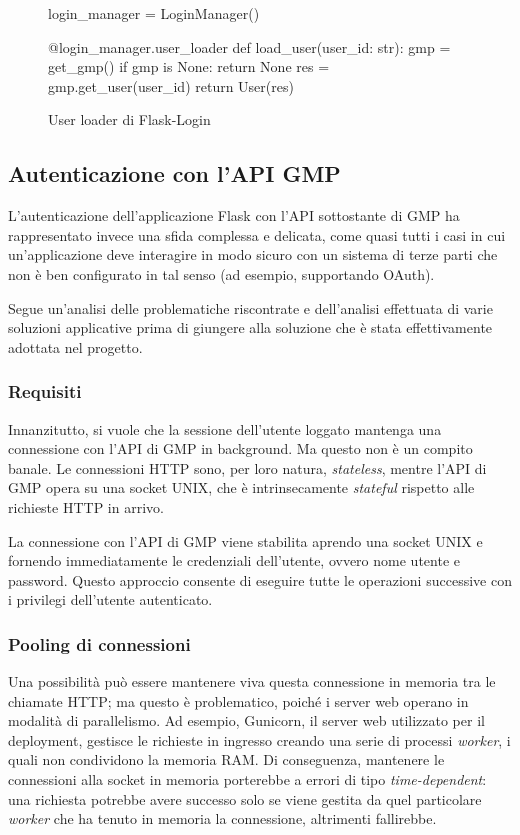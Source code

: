 \begin{figure}
\begin{pycode}
login_manager = LoginManager()

@login_manager.user_loader
def load_user(user_id: str):
    gmp = get_gmp()
    if gmp is None:
        return None
    res = gmp.get_user(user_id)
    return User(res)
\end{pycode}
\caption{User loader di Flask-Login}
\end{figure}

\subsection{Autenticazione con l'API GMP}
L'autenticazione dell'applicazione Flask con l'API sottostante di GMP ha rappresentato invece una sfida complessa e delicata, come quasi tutti i casi in cui un'applicazione deve interagire in modo sicuro con un sistema di terze parti che non è ben configurato in tal senso (ad esempio, supportando OAuth).

Segue un'analisi delle problematiche riscontrate e dell'analisi effettuata di varie soluzioni applicative prima di giungere alla soluzione che è stata effettivamente adottata nel progetto.

\subsubsection{Requisiti}
Innanzitutto, si vuole che la sessione dell'utente loggato mantenga una connessione con l'API di GMP in background. Ma questo non è un compito banale. Le connessioni HTTP sono, per loro natura, \emph{stateless}, mentre l'API di GMP opera su una socket UNIX, che è intrinsecamente \emph{stateful} rispetto alle richieste HTTP in arrivo.

La connessione con l'API di GMP viene stabilita aprendo una socket UNIX e fornendo immediatamente le credenziali dell'utente, ovvero nome utente e password. Questo approccio consente di eseguire tutte le operazioni successive con i privilegi dell'utente autenticato.

\subsubsection{Pooling di connessioni}
Una possibilità può essere mantenere viva questa connessione in memoria tra le chiamate HTTP; ma questo è problematico, poiché i server web operano in modalità di parallelismo. Ad esempio, Gunicorn, il server web utilizzato per il deployment, gestisce le richieste in ingresso creando una serie di processi \emph{worker}, i quali non condividono la memoria RAM. Di conseguenza, mantenere le connessioni alla socket in memoria porterebbe a errori di tipo \emph{time-dependent}: una richiesta potrebbe avere successo solo se viene gestita da quel particolare \emph{worker} che ha tenuto in memoria la connessione, altrimenti fallirebbe.

